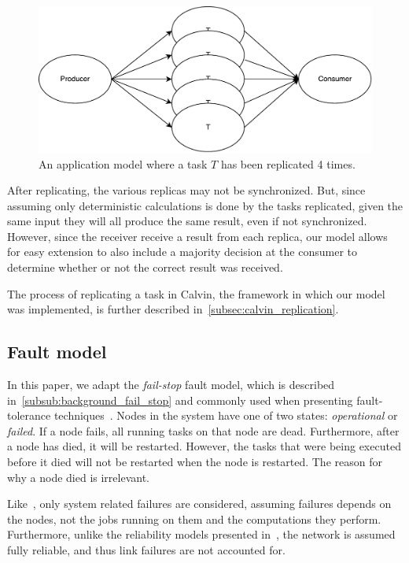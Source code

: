\documentclass{cslthse-msc}
\begin{document}
\begin{figure}[!hbt]
\centering
\includegraphics[scale=0.5]{images/app_model_replication.pdf} 
\caption[Application model with replicas]{An application model where a task $T$ has been replicated 4 times.}\label{fig:app_model_replication}
\end{figure}

After replicating, the various replicas may not be synchronized. But, since assuming only deterministic calculations is done by the tasks replicated, given the same input they will all produce the same result, even if not synchronized. However, since the receiver receive a result from each replica, our model allows for easy extension to also include a majority decision at the consumer to determine whether or not the correct result was received. %

The process of replicating a task in Calvin, the framework in which our model was implemented, is further described in~\cref{subsec:calvin_replication}.

\subsection{Fault model} \label{subsec:design_fault_model}
In this paper, we adapt the \emph{fail-stop} fault model, which is described in~\cref{subsub:background_fail_stop} and commonly used when presenting fault-tolerance techniques~\cite{surveyFaultParallel}. Nodes in the system have one of two states: \emph{operational} or \emph{failed}. If a node fails, all running tasks on that node are dead. Furthermore, after a node has died, it will be restarted. However, the tasks that were being executed before it died will not be restarted when the node is restarted. The reason for why a node died is irrelevant.

Like~\cite{selfAdaptRel}, only system related failures are considered, assuming failures depends on the nodes, not the jobs running on them and the computations they perform. Furthermore, unlike the reliability models presented in~\cite{taskSchedulingReplication, taskAllocationSwarm, relAnalysisFRA}, the network is assumed fully reliable, and thus link failures are not accounted for.
\end{document}
